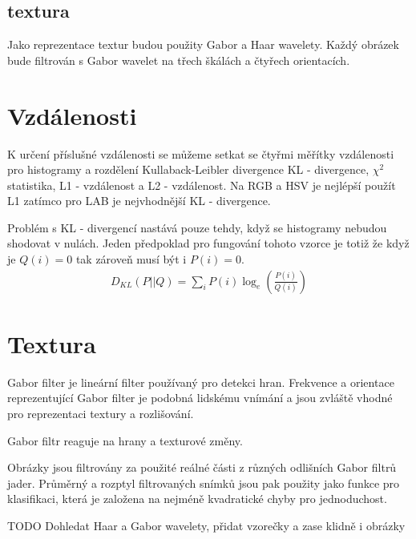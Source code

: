 \documentclass[czech,BP]{thesiskiv}
\begin{document}
\subsection{textura}
Jako reprezentace textur budou použity Gabor a Haar wavelety. Každý obrázek bude filtrován s Gabor wavelet na třech škálách a čtyřech orientacích.
 
\section{Vzdálenosti}
 K určení příslušné vzdálenosti se můžeme setkat se čtyřmi měřítky vzdálenosti pro histogramy a rozdělení Kullaback-Leibler divergence KL - divergence, $\chi^2$ statistika, L1 - vzdálenost a L2 - vzdálenost. Na RGB a HSV je nejlépší použít L1 zatímco pro LAB je nejvhodnější KL - divergence. 

Problém s KL - divergencí nastává pouze tehdy, když se histogramy nebudou shodovat v nulách. Jeden předpoklad pro fungování tohoto vzorce je totiž že když je $Q(i) = 0$ tak zároveň musí být i $P(i) = 0$.    
\begin{align}
   \label{kl}  D_{KL} (P || Q) = \sum_{i} P(i) \log_e({\frac{P(i)}{Q(i)}}) 
\end{align}

 
\section{Textura}


Gabor filter je lineární filter používaný pro detekci hran. Frekvence a orientace reprezentující Gabor filter je podobná lidskému vnímání a jsou zvláště vhodné pro reprezentaci textury a rozlišování. 

Gabor filtr reaguje na hrany a texturové změny. 

Obrázky jsou filtrovány za použité reálné části z různých odlišních Gabor filtrů jader. Průměrný a rozptyl filtrovaných snímků jsou pak použity jako funkce pro klasifikaci, která je založena na nejméně kvadratické chyby pro jednoduchost.


TODO Dohledat Haar a Gabor wavelety, přidat vzorečky a zase klidně i obrázky
\end{document}
